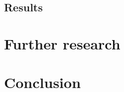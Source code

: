 \documentclass[twoside,11pt]{article}
\begin{document}
\subsection{Results}


%  


\section{Further research}
\label{sec:further_research}

\section{Conclusion}
\end{document}
